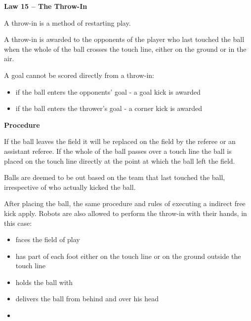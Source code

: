\clearpage
\sffamily
{\bfseries
\textcolor[rgb]{0.4,0.4,0.4}{Law 15 -- The Throw-In} }
{}


\bigskip

A throw-in is a method of restarting play.

\bigskip

A throw-in is awarded to the opponents of the player who last touched the ball when the whole of the ball crosses the touch line, either on the ground or in the air.


\bigskip

A goal cannot be scored directly from a throw-in:
\begin{itemize}
\item if the ball enters the opponents' goal - a goal kick is awarded
\item if the ball enters the thrower's goal - a corner kick is awarded
\end{itemize}

\bigskip

{\bfseries Procedure }

\headlinebox 

If the ball leaves the field it will be replaced on the field by the referee or
an assistant referee.
If the whole of the ball passes over a touch line the ball is placed on the
touch line directly at the point at which the ball left the field.

\bigskip

Balls are deemed to be out based on the team that last touched the ball,
irrespective of who actually kicked the ball.

\bigskip

After placing the ball, the same procedure and rules of executing a indirect free kick apply.
Robots are also allowed to perform the throw-in with their hands, in this case:

\begin{itemize}
\item faces the field of play
\item has part of each foot either on the touch line or on the ground outside
      the touch line
\item holds the ball with  
\item delivers the ball from behind and over his head
\item {}
\end{itemize}

